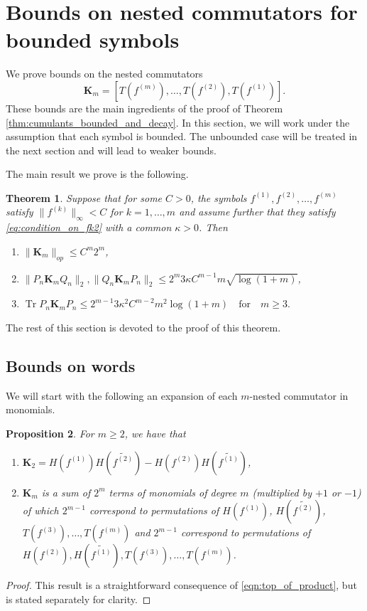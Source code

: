 \documentclass[11pt]{amsart}
\theoremstyle{plain}
\newtheorem{theorem}{Theorem}[section]
\newtheorem{proposition}[theorem]{Proposition}
\theoremstyle{remark}
\DeclareMathOperator{\Tr}{Tr}
\numberwithin{equation}{section}
\begin{document}
\section{Bounds on nested commutators for bounded symbols}
\label{sec:norm_estimates}
We prove bounds on the nested commutators
\begin{equation}\label{eqn:m-nested_commutator}
    \mathbf{K}_m=[T(f^{(m)}),\ldots, T(f^{(2)}), T(f^{(1)})].
\end{equation}
These bounds are the main ingredients of the proof of Theorem \ref{thm:cumulants_bounded_and_decay}. In this section, we will work under the assumption that each symbol is bounded. The unbounded case will be treated in the next section and will lead to weaker bounds. 

The main result we prove is the following.

\begin{theorem}\label{thm:bound_on_easy_nested}
Suppose that for some $C>0$, the symbols $f^{(1)},f^{(2)},\ldots, f^{(m)}$ satisfy $\|f^{(k)}\|_{\infty}< C$ for $k=1,\ldots, m$ and assume further that they satisfy \eqref{eq:condition_on_fk2} with a common $\kappa>0$. Then
%
%
\begin{enumerate}
\item $\|\mathbf{K}_m\|_{op}\leq C^m 2^m$,
\item $\|P_n\mathbf{K}_mQ_n\|_{2}, \|Q_n\mathbf{K}_mP_n\|_{2}\leq 2^{m} 3\kappa C^{m-1} m \sqrt{\log(1+m)}$,
\item $\Tr P_n \mathbf{K}_m P_n \leq 2^{m-1} 3 \kappa^2  C^{m-2} m^2 \log(1+m)
\quad\text{for}\quad m\geq 3.$
\end{enumerate}
\end{theorem}

The rest of this section is devoted to the proof of this theorem. 
\subsection{Bounds on words}
We will start with the following an expansion of each $m$-nested commutator in monomials.
%
%
%
\begin{proposition}\label{prop:structural_1}
For $m\geq 2$,
%
%
%
we have that 
\begin{enumerate}
\item $\mathbf{K}_2=H(f^{(1)})H(\widetilde{f^{(2)}})-H(f^{(2)})H(\widetilde{f^{(1)}})$,
\item $\mathbf{K}_m$ is a sum of $2^m$ terms of monomials of degree $m$ (multiplied by $+1$ or $-1$) of which 
$2^{m-1}$ correspond to permutations of $H(f^{(1)})$, $H(\widetilde{f^{(2)}})$, $T(f^{(3)}),\ldots, T(f^{(m)})$ and $2^{m-1}$ correspond to permutations of
$H(f^{(2)}), H(\widetilde{f^{(1)}}), T(f^{(3)}),\ldots, T(f^{(m)})$.
\end{enumerate}
\end{proposition}
\begin{proof}
This result is a straightforward consequence of \eqref{eqn:top_of_product}, but is stated separately for clarity.
\end{proof}
\end{document}
